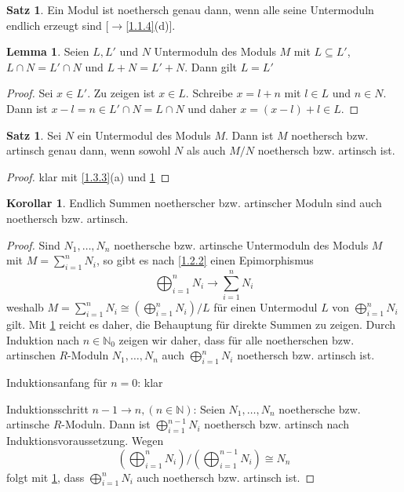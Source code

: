 \documentclass[
twoside=semi,
fontsize=12,
DIV=12, 
cleardoublepage=current,
leqno,
headings=optiontoheadandtoc, 
toc=idx
]{scrbook}
\newcommand{\N}{\mathbb{N}}
\newcommand{\brac}[1]{\left( #1 \right)}
\theoremstyle{definition}
\newtheorem{satz}[definition]{Satz}
\newtheorem{lemma}[definition]{Lemma}
\newtheorem{korollar}[definition]{Korollar}
\begin{document}
	\begin{satz}\label{1.4.3}
		Ein Modul ist noethersch genau dann, wenn alle seine Untermoduln endlich erzeugt sind [$\rightarrow$\ref{1.1.4}(d)].
	\end{satz}

	\begin{lemma}\label{1.4.4}
		Seien $L, L'$ und $N$ Untermoduln des Moduls $M$ mit $L \subseteq L'$, $L \cap N = L' \cap N$ und $L+N=L'+N$. Dann gilt $L=L'$
		
		\begin{proof}
			Sei $x \in L'$. Zu zeigen ist $x \in L$. Schreibe $x = l + n$ mit $l \in L$ und $n \in N$. Dann ist $x-l = n \in L' \cap N = L \cap N$ und daher $x = (x-l)+l \in L$. 
		\end{proof}
	\end{lemma}

	\begin{satz}\label{1.4.5}
		Sei $N$ ein Untermodul des Moduls $M$. Dann ist $M$ noethersch bzw. artinsch genau dann, wenn sowohl $N$ als auch $M/N$ noethersch bzw. artinsch ist.
		
		\begin{proof}
			klar mit \ref{1.3.3}(a) und \ref{1.4.4}
		\end{proof}
	\end{satz}

	\begin{korollar}\label{1.4.6}
		Endlich Summen noetherscher bzw. artinscher Moduln sind auch noethersch bzw. artinsch.
		
		\begin{proof}
			Sind $N_1, \dots, N_n$ noethersche bzw. artinsche Untermoduln des Moduls $M$ mit $M = \sum_{i=1}^n N_i$, so gibt es nach \ref{1.2.2} einen Epimorphismus 
				\[\bigoplus_{i=1}^n N_i \to \sum_{i=1}^n N_i\]
			weshalb $M = \sum_{i=1}^nN_i \cong \brac{\bigoplus_{i=1}^n N_i} / L$ f\"ur einen Untermodul $L$ von $\bigoplus_{i=1}^nN_i$ gilt.\newline
			Mit \ref{1.4.5} reicht es daher, die Behauptung f\"ur direkte Summen zu zeigen.\newline
			Durch Induktion nach $n \in \N_0$ zeigen wir daher, dass f\"ur alle noetherschen bzw. artinschen $R$-Moduln $N_1, \dots, N_n$ auch $\bigoplus_{i=1}^n N_i$ noethersch bzw. artinsch ist.
			
			\noindent Induktionsanfang f\"ur $n = 0$: klar
			
			\noindent Induktionsschritt $n-1 \to n, (n \in \N)$: Seien $N_1, \dots, N_n$ noethersche bzw. artinsche $R$-Moduln. Dann ist $\bigoplus_{i=1}^{n-1} N_i$ noethersch bzw. artinsch nach Induktionsvoraussetzung. Wegen 
				\[\brac{\bigoplus_{i=1}^n N_i} / \brac{\bigoplus_{i=1}^{n-1} N_i} \cong N_n\]
			folgt mit \ref{1.4.5}, dass $\bigoplus_{i=1}^n N_i$ auch noethersch bzw. artinsch ist.
		\end{proof}
	\end{korollar}
\end{document}
